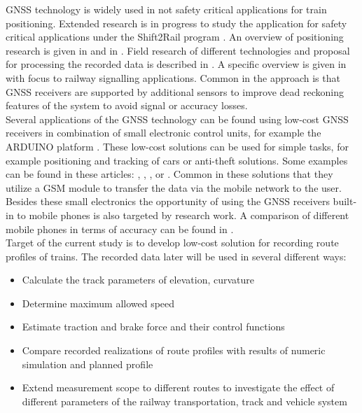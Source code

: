 \documentclass{article}
\begin{document}
		GNSS technology is widely used in not safety critical applications for train positioning. Extended research is in progress to study the application for safety critical applications under the Shift2Rail program \cite{HomeShift2Rail}. An overview of positioning research is given in \cite{oteguiSurveyTrainPositioning2017} and in \cite{spinsanteHybridizedGNSSApproachesTrain2020}. Field research of different technologies and proposal for processing the recorded data is described in \cite{oteguiEvaluationExperimentalGNSS2019}. A specific overview is given in \cite{maraisSurveyGNSSBasedResearch2017} with focus to railway signalling applications. Common in the approach is that GNSS receivers are supported by additional sensors to improve dead reckoning features of the system to avoid signal or accuracy losses. \\
		Several applications of the GNSS technology can be found using low-cost GNSS receivers in combination of small electronic control units, for example the ARDUINO platform \cite{ArduinoHome}. These low-cost solutions can be used for simple tasks, for example positioning and tracking of cars or anti-theft solutions. Some examples can be found in these articles: \cite{costanzoArduinoBasedSystem2013}, \cite{mokhinRealTimeVehicleTracking2018}, \cite{molooLowCostMobileGPS2011}, \cite{moralloVehicleTrackerSystem2021} or \cite{rahmanRealTimeGoogle2016}. Common in these solutions that they utilize a GSM module to transfer the data via the mobile network to the user. Besides these small electronics the opportunity of using the GNSS receivers built-in to mobile phones is also targeted by research work. A comparison of different mobile phones in terms of accuracy can be found in \cite{szotComparativeAnalysisPositioning2019}.\\
		Target of the current study is to develop low-cost solution for recording route profiles of trains. The recorded data later will be used in several different ways:
		\begin{itemize}
			\item Calculate the track parameters of elevation, curvature
			\item Determine maximum allowed speed
			\item Estimate traction and brake force and their control functions
			\item Compare recorded realizations of route profiles with results of numeric simulation and planned profile
			\item Extend measurement scope to different routes to investigate the effect of different parameters of the railway transportation, track and vehicle system
		\end{itemize}
\end{document}
